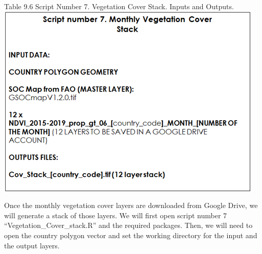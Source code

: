 \documentclass[
  10pt,
  b5paper,
]{book}
\begin{document}
Table 9.6 Script Number 7. Vegetation Cover Stack. Inputs and Outputs.
\includegraphics{tables/Table_9.6.png}

Once the monthly vegetation cover layers are downloaded from Google Drive, we will generate a stack of those layers. We will first open script number 7 ``Vegetation\_Cover\_stack.R'' and the required packages. Then, we will need to open the country polygon vector and set the working directory for the input and the output layers.
\end{document}
